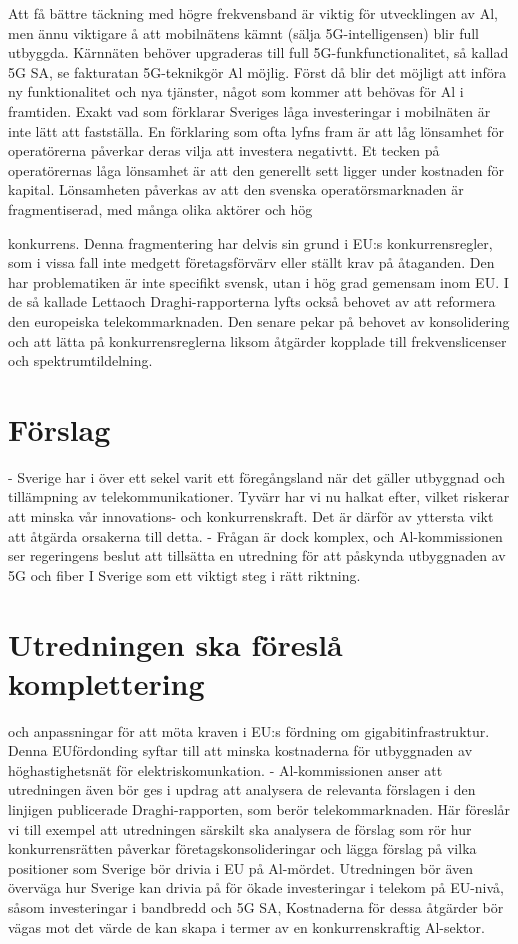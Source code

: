 {{Att få bättre täckning med högre frekvensband är viktig för utvecklingen av Al, men ännu viktigare å att mobilnätens kämnt (sälja 5G-intelligensen) blir full utbyggda. Kärnnäten behöver upgraderas till full 5G-funkfunctionalitet, så kallad 5G SA, se fakturatan 5G-teknikgör Al möjlig. Först då blir det möjligt att införa ny funktionalitet och nya tjänster, något som kommer att behövas för Al i framtiden.
Exakt vad som förklarar Sveriges låga investeringar i mobilnäten är inte lätt att fastställa. En förklaring som ofta lyfns fram är att låg lönsamhet för operatörerna påverkar deras vilja att investera negativtt. Et tecken på operatörernas låga lönsamhet är att den generellt sett ligger under kostnaden för kapital. Lönsamheten påverkas av att den svenska operatörsmarknaden är fragmentiserad, med många olika aktörer och hög

konkurrens. Denna fragmentering har delvis sin grund i EU:s konkurrensregler, som i vissa fall inte medgett företagsförvärv eller ställt krav på åtaganden. Den har problematiken är inte specifikt svensk, utan i hög grad gemensam inom EU. I de så kallade Lettaoch Draghi-rapporterna lyfts också behovet av att reformera den europeiska telekommarknaden. Den senare pekar på behovet av konsolidering och att lätta på konkurrensreglerna liksom åtgärder kopplade till frekvenslicenser och spektrumtildelning.
\section*{Förslag}
- Sverige har i över ett sekel varit ett föregångsland när det gäller utbyggnad och tillämpning av telekommunikationer. Tyvärr har vi nu halkat efter, vilket riskerar att minska vår innovations- och konkurrenskraft. Det är därför av yttersta vikt att åtgärda orsakerna till detta.
- Frågan är dock komplex, och Al-kommissionen ser regeringens beslut att tillsätta en utredning för att påskynda utbyggnaden av 5G och fiber I Sverige som ett viktigt steg i rätt riktning.
\section*{Utredningen ska föreslå komplettering} och anpassningar för att möta kraven i EU:s fördning om gigabitinfrastruktur. Denna EUfördonding syftar till att minska kostnaderna för utbyggnaden av höghastighetsnät för elektriskomunkation.
- Al-kommissionen anser att utredningen även bör ges i updrag att analysera de relevanta förslagen i den linjigen publicerade Draghi-rapporten, som berör telekommarknaden. Här föreslår vi till exempel att utredningen särskilt ska analysera de förslag som rör hur konkurrensrätten påverkar företagskonsolideringar och lägga förslag på vilka positioner som Sverige bör drivia i EU på Al-mördet. Utredningen bör även överväga hur Sverige kan drivia på för ökade investeringar i telekom på EU-nivå, såsom investeringar i bandbredd och 5G SA, Kostnaderna för dessa åtgärder bör vägas mot det värde de kan skapa i termer av en konkurrenskraftig Al-sektor.
}}
